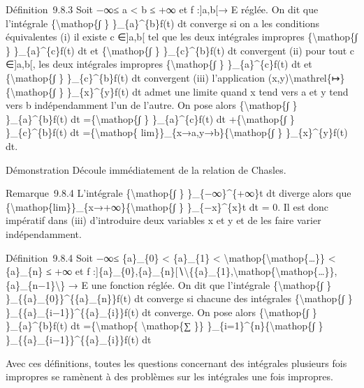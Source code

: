 \documentclass[]{article}
\begin{document}
Définition~9.8.3 Soit −∞≤ a \textless{} b ≤ +∞ et f :{]}a,b{[}→ E
réglée. On dit que l'intégrale \{\textbackslash{}mathop\{∫ \}
\}\_\{a\}\^{}\{b\}f(t) dt converge si on a les conditions équivalentes
(i) il existe c ∈{]}a,b{[} tel que les deux intégrales impropres
\{\textbackslash{}mathop\{∫ \} \}\_\{a\}\^{}\{c\}f(t) dt et
\{\textbackslash{}mathop\{∫ \} \}\_\{c\}\^{}\{b\}f(t) dt convergent (ii)
pour tout c ∈{]}a,b{[}, les deux intégrales impropres
\{\textbackslash{}mathop\{∫ \} \}\_\{a\}\^{}\{c\}f(t) dt et
\{\textbackslash{}mathop\{∫ \} \}\_\{c\}\^{}\{b\}f(t) dt convergent
(iii) l'application
(x,y)\textbackslash{}mathrel\{↦\}\{\textbackslash{}mathop\{∫ \}
\}\_\{x\}\^{}\{y\}f(t) dt admet une limite quand x tend vers a et y tend
vers b indépendamment l'un de l'autre. On pose alors
\{\textbackslash{}mathop\{∫ \} \}\_\{a\}\^{}\{b\}f(t) dt
=\{\textbackslash{}mathop\{∫ \} \}\_\{a\}\^{}\{c\}f(t) dt
+\{\textbackslash{}mathop\{∫ \} \}\_\{c\}\^{}\{b\}f(t) dt
=\{\textbackslash{}mathop\{
lim\}\}\_\{x→a,y→b\}\{\textbackslash{}mathop\{∫ \}
\}\_\{x\}\^{}\{y\}f(t) dt.

Démonstration Découle immédiatement de la relation de Chasles.

Remarque~9.8.4 L'intégrale \{\textbackslash{}mathop\{∫ \}
\}\_\{−∞\}\^{}\{+∞\}t dt diverge alors que
\{\textbackslash{}mathop\{lim\}\}\_\{x→+∞\}\{\textbackslash{}mathop\{∫
\} \}\_\{−x\}\^{}\{x\}t dt = 0. Il est donc impératif dans (iii)
d'introduire deux variables x et y et de les faire varier
indépendamment.

Définition~9.8.4 Soit −∞≤ \{a\}\_\{0\} \textless{} \{a\}\_\{1\}
\textless{} \textbackslash{}mathop\{\textbackslash{}mathop\{\ldots{}\}\}
\textless{} \{a\}\_\{n\} ≤ +∞ et f
:{]}\{a\}\_\{0\},\{a\}\_\{n\}{[}∖\textbackslash{}\{\{a\}\_\{1\},\textbackslash{}mathop\{\textbackslash{}mathop\{\ldots{}\}\},\{a\}\_\{n−1\}\textbackslash{}\}
→ E une fonction réglée. On dit que l'intégrale
\{\textbackslash{}mathop\{∫ \}
\}\_\{\{a\}\_\{0\}\}\^{}\{\{a\}\_\{n\}\}f(t) dt converge si chacune des
intégrales \{\textbackslash{}mathop\{∫ \}
\}\_\{\{a\}\_\{i−1\}\}\^{}\{\{a\}\_\{i\}\}f(t) dt converge. On pose
alors \{\textbackslash{}mathop\{∫ \} \}\_\{a\}\^{}\{b\}f(t) dt
=\{\textbackslash{}mathop\{ \textbackslash{}mathop\{∑ \}\}
\}\_\{i=1\}\^{}\{n\}\{\textbackslash{}mathop\{∫ \}
\}\_\{\{a\}\_\{i−1\}\}\^{}\{\{a\}\_\{i\}\}f(t) dt

Avec ces définitions, toutes les questions concernant des intégrales
plusieurs fois impropres se ramènent à des problèmes sur les intégrales
une fois impropres.
\end{document}
